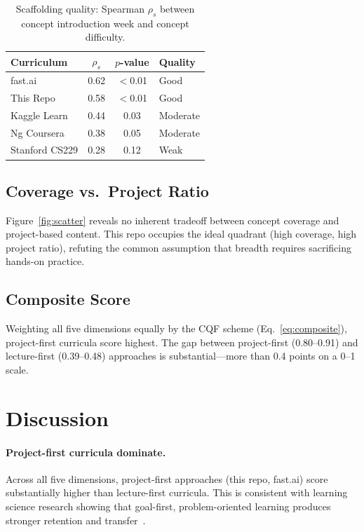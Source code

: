 \documentclass[10pt,twocolumn]{article}
\begin{document}
\begin{table}[h]
\centering
\caption{Scaffolding quality: Spearman $\rho_s$ between concept introduction 
week and concept difficulty.}
\label{tab:scaffolding}
\small
\begin{tabular}{lccl}
\toprule
\textbf{Curriculum} & $\rho_s$ & $p$-value & \textbf{Quality} \\
\midrule
fast.ai      & 0.62 & $<$0.01 & Good \\
This Repo    & 0.58 & $<$0.01 & Good \\
Kaggle Learn & 0.44 & 0.03    & Moderate \\
Ng Coursera  & 0.38 & 0.05    & Moderate \\
Stanford CS229 & 0.28 & 0.12  & Weak \\
\bottomrule
\end{tabular}
\end{table}

\subsection{Coverage vs.\ Project Ratio}

Figure~\ref{fig:scatter} reveals no inherent tradeoff between concept coverage 
and project-based content. This repo occupies the ideal quadrant (high coverage, 
high project ratio), refuting the common assumption that breadth requires sacrificing 
hands-on practice.

\subsection{Composite Score}

Weighting all five dimensions equally by the CQF scheme (Eq.~\ref{eq:composite}), 
project-first curricula score highest. The gap between project-first (0.80–0.91) 
and lecture-first (0.39–0.48) approaches is substantial—more than 0.4 points on a 0–1 scale.

\section{Discussion}

\paragraph{Project-first curricula dominate.}
Across all five dimensions, project-first approaches (this repo, fast.ai) 
score substantially higher than lecture-first curricula. This is consistent with 
learning science research showing that goal-first, problem-oriented learning 
produces stronger retention and transfer~\citep{ko2020computing}.
\end{document}
